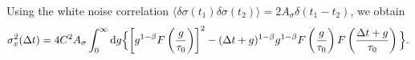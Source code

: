 \documentclass[aps, prl, longbibliography, linenumbers, superscriptaddress]{revtex4-2}
\begin{document}
{Using the white noise correlation $\langle \delta \sigma(t_1) \delta \sigma(t_2) \rangle = 2A_{\sigma}\delta(t_1 - t_2)$, we obtain
\begin{equation}
	\sigma_x^2(\Delta t) = 4C^2 A_{\sigma}\int_0^{\infty} \mathrm{d}g \Bigl\{ \left[ g^{1-\beta} F\left(\frac{g}{\tau_0}\right) \right]^2- (\Delta t + g)^{1-\beta} g^{1-\beta} F\left(\frac{g}{\tau_0}\right) F\left(\frac{\Delta t + g}{\tau_0}\right)\Bigl\}.
\end{equation}





}
\end{document}
